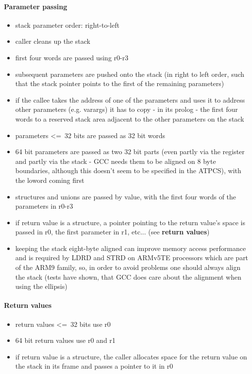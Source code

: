 \paragraph{Parameter passing}

\begin{itemize}
\item stack parameter order: right-to-left
\item caller cleans up the stack
\item first four words are passed using r0-r3
\item subsequent parameters are pushed onto the stack (in right to left order, such that the stack pointer points to the first of the remaining parameters)
\item if the callee takes the address of one of the parameters and uses it to address other parameters (e.g. varargs) it has to copy - in its prolog - the first four words to a reserved stack area adjacent to the other parameters on the stack
\item parameters \textless=\ 32 bits are passed as 32 bit words
\item 64 bit parameters are passed as two 32 bit parts (even partly via the register and partly via the stack - GCC needs them to be aligned on 8 byte boundaries, although this doesn't seem to be specified in the ATPCS), with the loword coming first
\item structures and unions are passed by value, with the first four words of the parameters in r0-r3
\item if return value is a structure, a pointer pointing to the return value's space is passed in r0, the first parameter in r1, etc... (see {\bf return values})
\item keeping the stack eight-byte aligned can improve memory access performance and is required by LDRD and STRD on ARMv5TE processors which are part of the ARM9 family, so, in order to avoid problems one should always align the stack (tests have shown, that GCC does care about the alignment when using the ellipsis)
\end{itemize}

\paragraph{Return values}
\begin{itemize}
\item return values \textless=\ 32 bits use r0
\item 64 bit return values use r0 and r1
\item if return value is a structure, the caller allocates space for the return value on the stack in its frame and passes a pointer to it in r0
\end{itemize}

